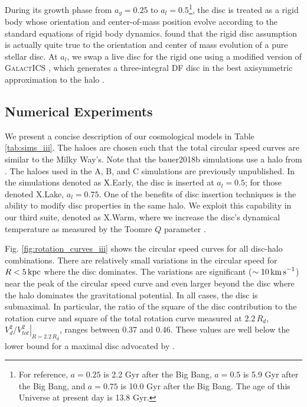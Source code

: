 During its growth phase from $a_g=0.25$ to $a_l=0.5$\footnote{For
  reference, $a=0.25$ is 2.2 Gyr after the Big Bang, $a=0.5$ is 5.9
  Gyr after the Big Bang, and $a=0.75$ is 10.0 Gyr after the Big
  Bang. The age of this Universe at present day is 13.8 Gyr.}, the
disc is treated as a rigid body whose orientation and center-of-mass
position evolve according to the standard equations of rigid body
dynamics. \citet{bauer2018a} found that the rigid disc assumption is
actually quite true to the orientation and center of mass evolution of
a pure stellar disc. At $a_l$, we swap a live disc for the rigid one
using a modified version of \textsc{GalactICS}
\citep{KGGalactICSReference,WPDGalactICSReference}, which generates a
three-integral DF disc in the best axisymmetric approximation to the
halo \citet{bauer2018a}.

\subsection{Numerical Experiments} \label{ssec:numerical_experiments}

We present a concise description of our cosmological models in Table
\ref{tab:sims_iii}. The haloes are chosen such that the total circular
speed curves are similar to the Milky Way's. Note that the bauer2018b
simulations use a halo from \cite{bauer2018b}. The haloes used in the
A, B, and C simulations are previously unpublished.  In the
simulations denoted as X.Early, the disc is inserted at $a_l=0.5$; for
those denoted X.Lake, $a_l=0.75$.  One of the benefits of disc
insertion techniques is the ability to modify disc properties in the
same halo. We exploit this capability in our third suite, denoted as
X.Warm, where we increase the disc's dynamical temperature as
measured by the Toomre $Q$ parameter \citep{toomre_q}.
 
Fig. \ref{fig:rotation_curves_iii} shows the circular speed curves for all
disc-halo combinations. There are relatively small variations in the
circular speed for $R<5\,{\rm kpc}$ where the disc dominates. The
variations are significant ($\sim 10\,{\rm km\,s}^{-1}$) near the peak
of the circular speed curve and even larger beyond the disc where the
halo dominates the gravitational potential. In all cases, the disc is
submaximal. In particular, the ratio of the square of the disc
contribution to the rotation curve and square of the total rotation
curve measured at $2.2\, R_d$, $\left. V_d^2/V_{tot}^2 \right
\vert_{R=2.2\,R_d}$, ranges between 0.37 and 0.46. These values are
well below the lower bound for a maximal disc advocated by
\citet{sackett_1997}.

